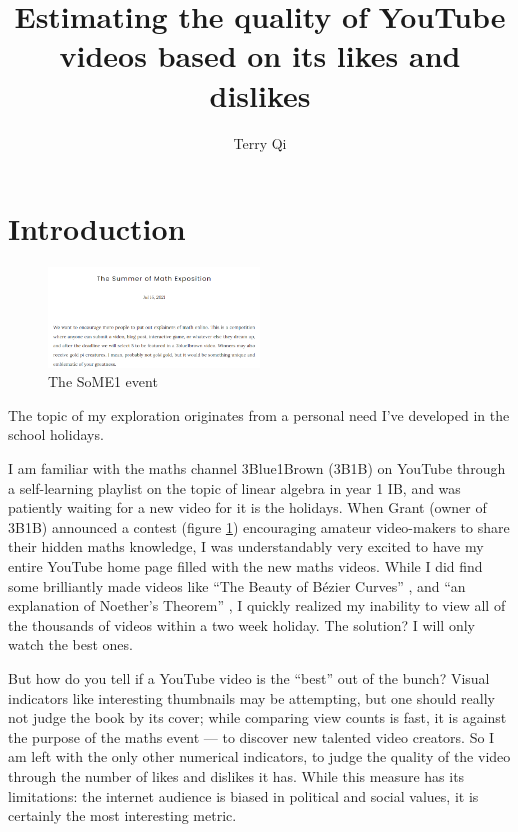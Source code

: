 \documentclass[a4paper,11pt]{article}
\title{\vspace{-8ex}Estimating the quality of YouTube videos based on its likes and dislikes}
\author{Terry Qi}
\date{}
\begin{document}




\maketitle

\section{Introduction}

\begin{figure}
    \centering
    \includegraphics[width=0.5\textwidth]{assets/som1.png}
    \caption{The SoME1 event}
    \label{fig:some1}
\end{figure}

The topic of my exploration originates from a personal need I've developed in the school holidays.

I am familiar with the maths channel 3Blue1Brown (3B1B) on YouTube through a self-learning playlist on the topic of linear algebra in year 1 IB, and was patiently waiting for a new video for it is the holidays. When Grant (owner of 3B1B) announced a contest (figure \ref{fig:some1}) \parencite{sanderson} encouraging amateur video-makers to share their hidden maths knowledge, I was understandably very excited to have my entire YouTube home page filled with the new maths videos. While I did find some brilliantly made videos like ``The Beauty of B\'{e}zier Curves'' \parencite{holmer_2021}, and ``an explanation of Noether's Theorem'' \parencite{m_2021}, I quickly realized my inability to view all of the thousands of videos within a two week holiday. The solution? I will only watch the best ones.

But how do you tell if a YouTube video is the ``best'' out of the bunch? Visual indicators like interesting thumbnails may be attempting, but one should really not judge the book by its cover; while comparing view counts is fast, it is against the purpose of the maths event --- to discover new talented video creators. So I am left with the only other numerical indicators, to judge the quality of the video through the number of likes and dislikes it has. While this measure has its limitations: the internet audience is biased in political and social values, it is certainly the most interesting metric.
\end{document}
